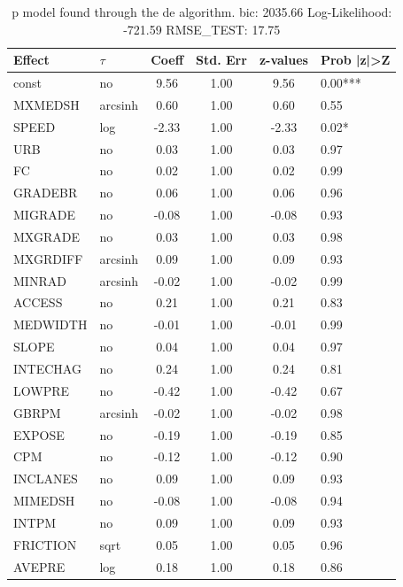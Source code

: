 \begin{table}
	\caption{p model found through the de algorithm. bic: 2035.66 Log-Likelihood: -721.59 RMSE_TEST: 17.75}
	\begin{center}
		\begin{tabular}{|l|l|c|c|c|l|}
			\hline
			Effect & $\tau$ & Coeff & Std. Err & z-values & Prob |z|>Z \\
			\hline
			const & no & 9.56 & 1.00 & 9.56 & 0.00*** \\
			\hline
			MXMEDSH & arcsinh & 0.60 & 1.00 & 0.60 & 0.55 \\
			\hline
			SPEED & log & -2.33 & 1.00 & -2.33 & 0.02* \\
			\hline
			URB & no & 0.03 & 1.00 & 0.03 & 0.97 \\
			\hline
			FC & no & 0.02 & 1.00 & 0.02 & 0.99 \\
			\hline
			GRADEBR & no & 0.06 & 1.00 & 0.06 & 0.96 \\
			\hline
			MIGRADE & no & -0.08 & 1.00 & -0.08 & 0.93 \\
			\hline
			MXGRADE & no & 0.03 & 1.00 & 0.03 & 0.98 \\
			\hline
			MXGRDIFF & arcsinh & 0.09 & 1.00 & 0.09 & 0.93 \\
			\hline
			MINRAD & arcsinh & -0.02 & 1.00 & -0.02 & 0.99 \\
			\hline
			ACCESS & no & 0.21 & 1.00 & 0.21 & 0.83 \\
			\hline
			MEDWIDTH & no & -0.01 & 1.00 & -0.01 & 0.99 \\
			\hline
			SLOPE & no & 0.04 & 1.00 & 0.04 & 0.97 \\
			\hline
			INTECHAG & no & 0.24 & 1.00 & 0.24 & 0.81 \\
			\hline
			LOWPRE & no & -0.42 & 1.00 & -0.42 & 0.67 \\
			\hline
			GBRPM & arcsinh & -0.02 & 1.00 & -0.02 & 0.98 \\
			\hline
			EXPOSE & no & -0.19 & 1.00 & -0.19 & 0.85 \\
			\hline
			CPM & no & -0.12 & 1.00 & -0.12 & 0.90 \\
			\hline
			INCLANES & no & 0.09 & 1.00 & 0.09 & 0.93 \\
			\hline
			MIMEDSH & no & -0.08 & 1.00 & -0.08 & 0.94 \\
			\hline
			INTPM & no & 0.09 & 1.00 & 0.09 & 0.93 \\
			\hline
			FRICTION & sqrt & 0.05 & 1.00 & 0.05 & 0.96 \\
			\hline
			AVEPRE & log & 0.18 & 1.00 & 0.18 & 0.86 \\

\end{tabular}
\end{center}
\end{table}
